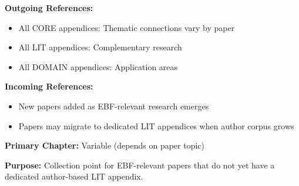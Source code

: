 \begin{tcolorbox}[colback=blue!5!white,colframe=blue!75!black,title=Cross-Reference Map]
\textbf{Outgoing References:}
\begin{itemize}
    \item All CORE appendices: Thematic connections vary by paper
    \item All LIT appendices: Complementary research
    \item All DOMAIN appendices: Application areas
\end{itemize}

\textbf{Incoming References:}
\begin{itemize}
    \item New papers added as EBF-relevant research emerges
    \item Papers may migrate to dedicated LIT appendices when author corpus grows
\end{itemize}
\end{tcolorbox}

\begin{tcolorbox}[colback=green!5!white,colframe=green!75!black,title=Chapter Linkage]
\textbf{Primary Chapter:} Variable (depends on paper topic)

\textbf{Purpose:} Collection point for EBF-relevant papers that do not yet have a dedicated author-based LIT appendix.
\end{tcolorbox}

\begin{abstract}
This appendix serves as a collection point for important research contributions that are relevant to the EBF framework but do not fit into existing author-based LIT appendices. Papers collected here may eventually migrate to dedicated appendices as author corpora grow or new thematic clusters emerge. The appendix is organized thematically rather than by author, allowing flexible integration of emerging research, cross-disciplinary contributions, and recent working papers.
\end{abstract}

